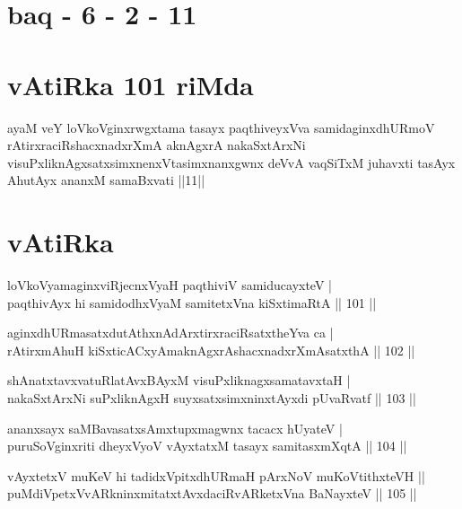 \section*{baq - 6 - 2 - 11}

\section*{vAtiRka 101 riMda}

\begin{shl}
ayaM veY loVkoV\s ginxrwgxtama tasayx paqthiveyxVva samidaginxdhURmoV rAtirxraciRshacxnadxrXmA aknAgxrA nakaSxtArxNi visuPxliknAgxsatxsimxnenxVtasimxnanxgwnx deVvA vaqSiTxM juhavxti tasAyx AhutAyx ananxM samaBxvati ||11||
\end{shl}

\section*{vAtiRka}

\begin{shl}
loVkoV\s yamaginxviRjecnxVyaH paqthiviV samiducayxteV | \\
paqthivAyx hi samidodhxV\s yaM samitetxVna kiSxtimaRtA \hfill|| 101 || 
\end{shl}

\begin{shl}
aginxdhURmasatxdutAthxnAdArxtirxraciRsatxtheYva ca | \\
rAtirxmAhuH kiSxticACxyAmaknAgxrAshacxnadxrXmAsatxthA \hfill|| 102 || 
\end{shl}

\begin{shl}
shAnatxtavxvatuRlatAvxBAyxM visuPxliknagxsamatavxtaH | \\
nakaSxtArxNi suPxliknAgxH suyxsatxsimxninxtAyxdi pUvaRvatf \hfill|| 103 || 
\end{shl}

\begin{shl}
ananxsayx saMBavasatxsAmxtupxmagwnx tacacx hUyateV | \\
puruSoV\s ginxriti dheyxVyoV vAyxtatxM tasayx samitasxmXqtA \hfill|| 104 || 
\end{shl}

\begin{shl}
vAyxtetxV muKeV hi tadidxVpitxdhURmaH pArxNoV muKoVtithxteVH || \\
puMdiVpetxVvARkninxmitatxtAvxdaciRvARketxVna BaNayxteV \hfill|| 105 || 
\end{shl}

